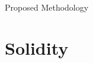 \documentclass[aspectratio=169]{beamer}
\begin{document}
\begin{frame}{Proposed Methodology}
\begin{figure}[!h]
\begin{tikzpicture}


\end{tikzpicture}
\end{figure}
\end{frame}


\section{Solidity}
\frame{\tableofcontents[currentsection]}

\end{document}

